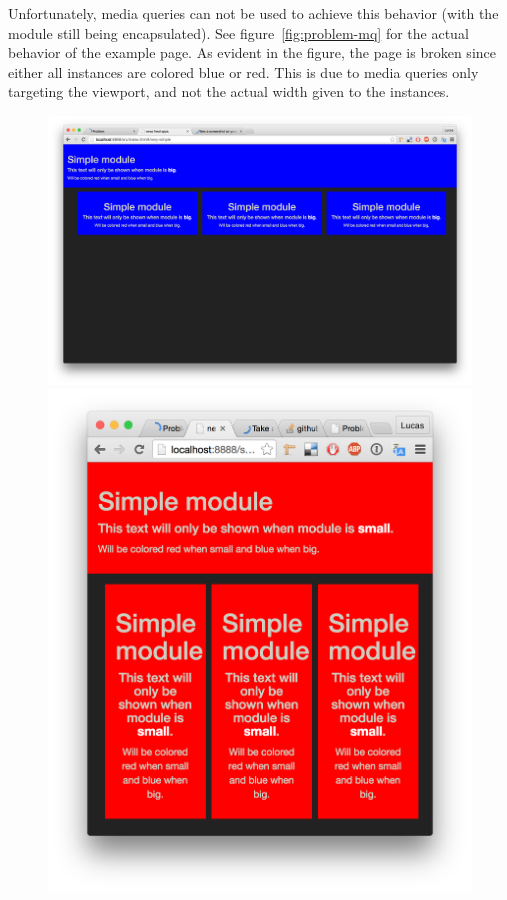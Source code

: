 \documentclass[a4paper,11pt]{kth-mag}
\begin{document}
        Unfortunately, media queries can not be used to achieve this behavior (with the module still being encapsulated).
        See figure~\ref{fig:problem-mq} for the actual behavior of the example page.
        As evident in the figure, the page is broken since either all instances are colored blue or red.
        This is due to media queries only targeting the viewport, and not the actual width given to the instances.
        \begin{figure}[ht]
          \centering
          \begin{minipage}{.5\textwidth}
            \centering
            \includegraphics[width=\linewidth]{images/mq-big}
          \end{minipage}%
          \begin{minipage}{.5\textwidth}
            \centering
            \includegraphics[width=\linewidth]{images/mq-small}

\end{minipage}
\end{figure}
\end{document}
